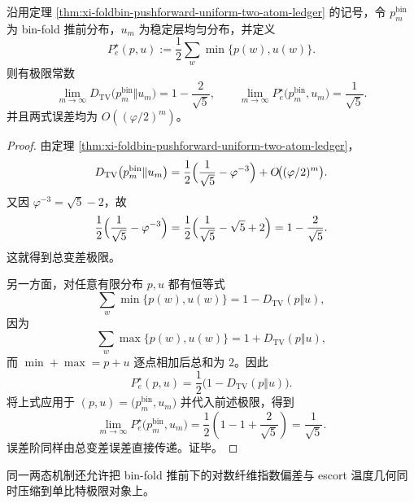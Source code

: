 \begin{corollary}\label{cor:derived-binfold-tv-bayes-constants}
沿用定理 \ref{thm:xi-foldbin-pushforward-uniform-two-atom-ledger} 的记号，令 \(p_m^{\mathrm{bin}}\) 为 bin-fold 推前分布，\(u_m\) 为稳定层均匀分布，并定义
\[
P_e^\star(p,u):=\frac12\sum_{w}\min\{p(w),u(w)\}.
\]
则有极限常数
\[
\boxed{\;
\lim_{m\to\infty}D_{\mathrm{TV}}\bigl(p_m^{\mathrm{bin}}\Vert u_m\bigr)
=
1-\frac{2}{\sqrt5},
\qquad
\lim_{m\to\infty}P_e^\star\bigl(p_m^{\mathrm{bin}},u_m\bigr)
=
\frac1{\sqrt5}.\;}
\]
并且两式误差均为 \(O((\varphi/2)^m)\)。
\end{corollary}
\begin{proof}
由定理 \ref{thm:xi-foldbin-pushforward-uniform-two-atom-ledger}，
\[
D_{\mathrm{TV}}\bigl(p_m^{\mathrm{bin}}\Vert u_m\bigr)
=
\frac12\Bigl(\frac1{\sqrt5}-\varphi^{-3}\Bigr)
+O\!\bigl((\varphi/2)^m\bigr).
\]
又因 \(\varphi^{-3}=\sqrt5-2\)，故
\[
\frac12\Bigl(\frac1{\sqrt5}-\varphi^{-3}\Bigr)
=
\frac12\Bigl(\frac1{\sqrt5}-\sqrt5+2\Bigr)
=
1-\frac{2}{\sqrt5}.
\]
这就得到总变差极限。

另一方面，对任意有限分布 \(p,u\) 都有恒等式
\[
\sum_w \min\{p(w),u(w)\}=1-D_{\mathrm{TV}}(p\Vert u),
\]
因为
\[
\sum_w \max\{p(w),u(w)\}=1+D_{\mathrm{TV}}(p\Vert u),
\]
而 \(\min+\max=p+u\) 逐点相加后总和为 \(2\)。因此
\[
P_e^\star(p,u)=\frac12\bigl(1-D_{\mathrm{TV}}(p\Vert u)\bigr).
\]
将上式应用于 \((p,u)=\bigl(p_m^{\mathrm{bin}},u_m\bigr)\) 并代入前述极限，得到
\[
\lim_{m\to\infty}P_e^\star\bigl(p_m^{\mathrm{bin}},u_m\bigr)
=
\frac12\left(1-1+\frac{2}{\sqrt5}\right)
=
\frac1{\sqrt5}.
\]
误差阶同样由总变差误差直接传递。证毕。
\end{proof}

同一两态机制还允许把 bin-fold 推前下的对数纤维指数偏差与 escort 温度几何同时压缩到单比特极限对象上。

